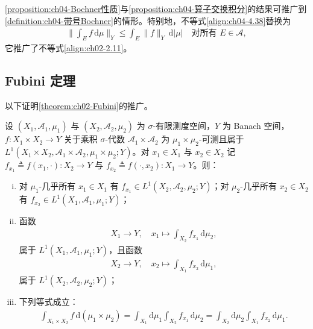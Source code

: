\documentclass[../../main.tex]{subfiles}%
\begin{document}
\cref{proposition:ch04-Bochner性质}与\cref{proposition:ch04-算子交换积分}的结果可推广到\cref{definition:ch04-带号Bochner}的情形。特别地，不等式\eqref{align:ch04-4.38}替换为
\begin{align*}
\Big\|\int_E f\,\mathrm{d}\mu\Big\|_Y\leqslant\int_E\|f\|_Y\,\mathrm{d}|\mu|\quad\text{对所有 }E\in\mathcal{A},
\end{align*}
它推广了不等式\eqref{align:ch02-2.11}。

\subsection{Fubini 定理}\label{subsection:ch04-Fubini}

以下证明\cref{theorem:ch02-Fubini}的推广。

\begin{theorem}[Fubini]\label{theorem:ch04-Fubini}
设 $(X_1,\mathcal{A}_1,\mu_1)$ 与 $(X_2,\mathcal{A}_2,\mu_2)$ 为 $\sigma$-有限测度空间，$Y$ 为 Banach 空间，$f:X_1\times X_2\to Y$ 关于乘积 $\sigma$-代数 $\mathcal{A}_1\times\mathcal{A}_2$ 为 $\mu_1\times\mu_2$-可测且属于 $L^1(X_1\times X_2,\mathcal{A}_1\times\mathcal{A}_2,\mu_1\times\mu_2;Y)$。对 $x_1\in X_1$ 与 $x_2\in X_2$ 记 $f_{x_1}\triangleq f(x_1,\cdot):X_2\to Y$ 与 $f_{x_2}\triangleq f(\cdot,x_2):X_1\to Y$。则：
\begin{enumerate}[(i)]
\item\label{item:ch04-Fubini-i} 对 $\mu_1$-几乎所有 $x_1\in X_1$ 有 $f_{x_1}\in L^1(X_2,\mathcal{A}_2,\mu_2;Y)$；对 $\mu_2$-几乎所有 $x_2\in X_2$ 有 $f_{x_2}\in L^1(X_1,\mathcal{A}_1,\mu_1;Y)$；
\item\label{item:ch04-Fubini-ii} 函数
\begin{align}
X_1\to Y,\quad x_1\mapsto\int_{X_2}f_{x_1}\,\mathrm{d}\mu_2, \label{align:ch04-4.49}
\end{align}
属于 $L^1(X_1,\mathcal{A}_1,\mu_1;Y)$，且函数
\begin{align}
X_2\to Y,\quad x_2\mapsto\int_{X_1}f_{x_2}\,\mathrm{d}\mu_1, \label{align:ch04-4.50}
\end{align}
属于 $L^1(X_2,\mathcal{A}_2,\mu_2;Y)$；
\item\label{item:ch04-Fubini-iii} 下列等式成立：
\begin{align}
\int_{X_1\times X_2}f\,\mathrm{d}(\mu_1\times\mu_2)=\int_{X_1}\mathrm{d}\mu_1\int_{X_2}f_{x_1}\,\mathrm{d}\mu_2=\int_{X_2}\mathrm{d}\mu_2\int_{X_1}f_{x_2}\,\mathrm{d}\mu_1. \label{align:ch04-4.51}
\end{align}
\end{enumerate}
\end{theorem}
\end{document}

